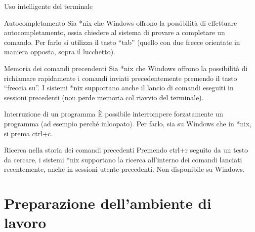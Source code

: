 \documentclass[presentation]{beamer}
\begin{document}
\begin{frame}[fragile]{Uso intelligente del terminale}
  \begin{block}{Autocompletamento}
    \scriptsize{}
    Sia *nix che Windows offrono la possibilità di effettuare autocompletamento, ossia chiedere al sistema di provare a completare un comando. Per farlo si utilizza il tasto ``tab'' (quello con due frecce orientate in maniera opposta, sopra il lucchetto).
  \end{block}
  \begin{block}{Memoria dei comandi precendenti}
    \scriptsize{}
    Sia *nix che Windows offrono la possibilità di richiamare rapidamente i comandi inviati precedentemente premendo il tasto ``freccia su''. I sistemi *nix supportano anche il lancio di comandi eseguiti in sessioni precedenti (non perde memoria col riavvio del terminale). 
  \end{block}
  \begin{block}{Interruzione di un programma}
    \scriptsize{}
    È possibile interrompere forzatamente un programma (ad esempio perché inloopato). Per farlo, sia su Windows che in *nix, si prema ctrl+c.
  \end{block}
  \begin{block}{Ricerca nella storia dei comandi precedenti}
    \scriptsize{}
    Premendo ctrl+r seguito da un testo da cercare, i sistemi *nix supportano la ricerca all'interno dei comandi lanciati recentemente, anche in sessioni utente precedenti. Non disponibile su Windows.
  \end{block}
\end{frame}



\section{Preparazione dell'ambiente di lavoro}

\end{document}
